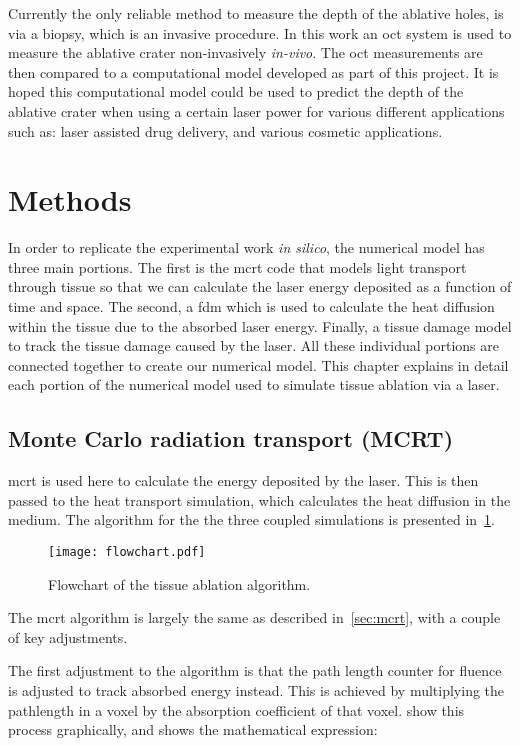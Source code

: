 Currently the only reliable method to measure the depth of the ablative holes, is via a biopsy, which is an invasive procedure. In this work an \gls{oct} system is used to measure the ablative crater non-invasively \textit{in-vivo}. The \gls{oct} measurements are then compared to a computational model developed as part of this project. It is hoped this computational model could be used to predict the depth of the ablative crater when using a certain laser power for various different applications such as: laser assisted drug delivery, and various cosmetic applications.



\section{Methods}

In order to replicate the experimental work \textit{in silico}, the numerical model has three main portions. The first is the \gls{mcrt} code that models light transport through tissue so that we can calculate the laser energy deposited as a function of time and space. The second, a \gls{fdm} which is used to calculate the heat diffusion within the tissue due to the absorbed laser energy. Finally, a tissue damage model to track the tissue damage caused by the laser. All these individual portions are connected together to create our numerical model. This chapter explains in detail each portion of the numerical model used to simulate tissue ablation via a laser.

\subsection{Monte Carlo radiation transport (MCRT)}

\Gls{mcrt} is used here to calculate the energy deposited by the laser. This is then passed to the heat transport simulation, which calculates the heat diffusion in the medium. The algorithm for the the three coupled simulations is presented in~\cref{fig:algoablation}.

\begin{figure}[!ht]
\centering
\texttt{[image: flowchart.pdf]}
\caption{Flowchart of the tissue ablation algorithm.}
\label{fig:algoablation}
\end{figure}

The \gls{mcrt} algorithm is largely the same as described in~\cref{sec:mcrt}, with a couple of key adjustments.

The first adjustment to the algorithm is that the path length counter for fluence is adjusted to track absorbed energy instead. This is achieved by multiplying the pathlength in a voxel by the absorption coefficient of that voxel.  show this process graphically, and  shows the mathematical expression:

